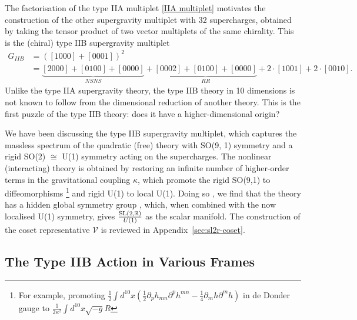 The factorisation of the type IIA multiplet \eqref{IIA multiplet} motivates the construction of the other supergravity multiplet with 32 supercharges, obtained by taking the tensor product of two vector multiplets of the same chirality. This is the (chiral) type IIB supergravity multiplet
\begin{equation}
\begin{aligned}
G_{IIB}
&=\left([1000] + [0001]\right)^2\\
&=\underbrace{[2000]+[0100] + [0000]}_{NSNS} 
+ \underbrace{[0002] + [0100] + [0000]}_{RR} + 2\cdot[1001] + 2\cdot[0010].
\end{aligned}
\end{equation}
Unlike the type IIA supergravity theory, the type IIB theory in 10 dimensions is not known to follow from the dimensional reduction of another theory.
This is the first puzzle of the type IIB theory: does it have a higher-dimensional origin?


We have been discussing the type IIB supergravity multiplet, which captures the massless spectrum of the quadratic (free) theory with SO(9, 1) symmetry and a rigid SO(2) $\cong$ U(1) symmetry acting on the supercharges.
The nonlinear (interacting) theory is obtained by restoring an infinite number of higher-order terms in the gravitational coupling $\kappa$, which promote the rigid SO(9,1) to diffeomorphisms%
\footnote{
For example, promoting $\frac{1}{2}\int d^{10}x\left(\frac{1}{2}\partial_p h_{mn}\partial^p h^{mn}-\frac{1}{4}\partial_m h \partial^m h\right)$ in de Donder gauge to $\frac{1}{2\kappa^2}\int d^{10}x\sqrt{-g}R$}
and rigid U(1) to local U(1). Doing so \cite{Green:1982tk,Schwarz:1983wa,Schwarz:1983qr,Howe:1983sra}, we find that the theory has a hidden global symmetry group \SLR{}, which, when combined with the now localised U(1) symmetry, gives $\frac{\mathrm{SL}(2,\mathbb{R}){}}{U(1)}$ as the scalar manifold. The construction of the coset representative $\mathcal{V}$ is reviewed in Appendix~\ref{sec:sl2r-coset}.

\subsection{The Type IIB Action in Various Frames}

